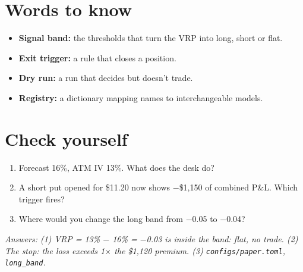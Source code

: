 \documentclass{article}
\begin{document}
\section{Words to know}

\begin{itemize}

\item \textbf{Signal band:} the thresholds that turn the VRP into long, short or flat.

\item \textbf{Exit trigger:} a rule that closes a position.

\item \textbf{Dry run:} a run that decides but doesn't trade.

\item \textbf{Registry:} a dictionary mapping names to interchangeable models.

\end{itemize}

\section{Check yourself}

\begin{enumerate}

\item Forecast 16\%, ATM IV 13\%. What does the desk do?

\item A short put opened for \$11.20 now shows \ensuremath{-}\$1,150 of combined P\&L. Which trigger fires?

\item Where would you change the long band from \ensuremath{-}0.05 to \ensuremath{-}0.04?

\end{enumerate}

\emph{Answers: (1) VRP = 13\% \ensuremath{-} 16\% = \ensuremath{-}0.03 is inside the band: flat, no trade. (2) The stop: the loss exceeds 1\ensuremath{\times} the \$1,120 premium. (3) \texttt{configs/\allowbreak{}paper.\allowbreak{}toml}, \texttt{long\_\allowbreak{}band}.}
\end{document}
